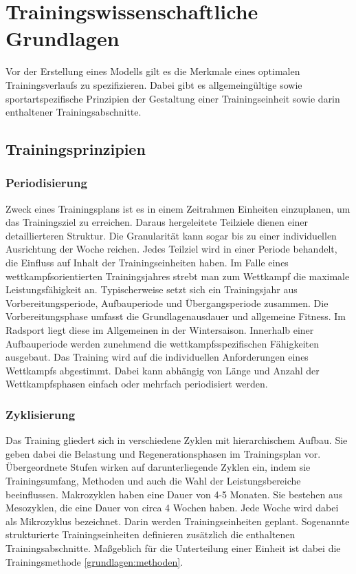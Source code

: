 \chapter{Trainingswissenschaftliche Grundlagen}
\label{sec:grundlagen:rad}
Vor der Erstellung eines Modells gilt es die Merkmale eines optimalen Trainingsverlaufs zu spezifizieren. Dabei gibt es allgemeingültige sowie sportartspezifische Prinzipien der Gestaltung einer Trainingseinheit sowie darin enthaltener Trainingsabschnitte.

\section{Trainingsprinzipien}
\subsection{Periodisierung}
    Zweck eines Trainingsplans ist es in einem Zeitrahmen Einheiten einzuplanen, um das Trainingsziel zu erreichen. Daraus hergeleitete Teilziele dienen einer detaillierteren Struktur. Die Granularität kann sogar bis zu einer individuellen Ausrichtung der Woche reichen. Jedes Teilziel wird in einer Periode behandelt, die Einfluss auf Inhalt der Trainingseinheiten haben.\cite{periodization} \newline
    Im Falle eines wettkampfsorientierten Trainingsjahres strebt man zum Wettkampf die maximale Leistungsfähigkeit an. Typischerweise setzt sich ein Trainingsjahr aus Vorbereitungsperiode, Aufbauperiode und Übergangsperiode zusammen.\cite[279]{Trainingswissenschaft} Die Vorbereitungsphase umfasst die Grundlagenausdauer und allgemeine Fitness. Im Radsport liegt diese im Allgemeinen in der Wintersaison. Innerhalb einer Aufbauperiode werden zunehmend die wettkampfsspezifischen Fähigkeiten ausgebaut. Das Training wird auf die individuellen Anforderungen eines Wettkampfs abgestimmt. Dabei kann abhängig von Länge und Anzahl der Wettkampfsphasen einfach oder mehrfach periodisiert werden.
\subsection{Zyklisierung}
    Das Training gliedert sich in verschiedene Zyklen mit hierarchischem Aufbau. Sie geben dabei die Belastung und Regenerationsphasen im Trainingsplan vor. Übergeordnete Stufen wirken auf darunterliegende Zyklen ein, indem sie Trainingsumfang, Methoden und auch die Wahl der Leistungsbereiche beeinflussen. \cite[283]{Trainingswissenschaft}
    Makrozyklen haben eine Dauer von 4-5 Monaten. Sie bestehen aus Mesozyklen, die eine Dauer von circa 4 Wochen haben. Jede Woche wird dabei als Mikrozyklus bezeichnet. Darin werden Trainingseinheiten geplant. Sogenannte strukturierte Trainingseinheiten definieren zusätzlich die enthaltenen Trainingsabschnitte. Maßgeblich für die Unterteilung einer Einheit ist dabei die Trainingsmethode \ref{grundlagen:methoden}.
